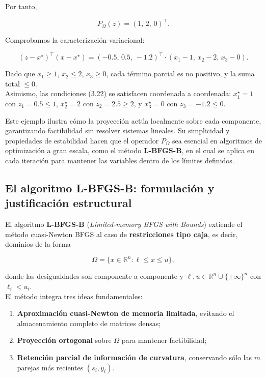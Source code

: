 \documentclass[
  spanish,
  us-letterpaper,
  DIV=11,
  numbers=noendperiod]{scrreprt}
\providecommand{\tightlist}{%
  \setlength{\itemsep}{0pt}\setlength{\parskip}{0pt}}
\numberwithin{equation}{section}
\begin{document}
Por tanto,

\[
P_\Omega(z) = (1,\, 2,\, 0)^\top.
\]

Comprobamos la caracterización variacional:

\[
(z - x^\star)^\top (x - x^\star)
= (-0.5,\, 0.5,\, -1.2)^\top \cdot (x_1-1,\, x_2-2,\, x_3-0).
\]

Dado que \(x_1 \ge 1\), \(x_2 \le 2\), \(x_3 \ge 0\), cada término
parcial es no positivo, y la suma total \(\le 0\).\\
Asimismo, las condiciones (3.22) se satisfacen coordenada a coordenada:
\(x_1^\star=1\) con \(z_1=0.5\le1\), \(x_2^\star=2\) con
\(z_2=2.5\ge2\), y \(x_3^\star=0\) con \(z_3=-1.2\le0\).

Este ejemplo ilustra cómo la proyección actúa localmente sobre cada
componente, garantizando factibilidad sin resolver sistemas lineales. Su
simplicidad y propiedades de estabilidad hacen que el operador
\(P_\Omega\) sea esencial en algoritmos de optimización a gran escala,
como el método \textbf{L-BFGS-B}, en el cual se aplica en cada iteración
para mantener las variables dentro de los límites definidos.

\subsection{El algoritmo L-BFGS-B: formulación y justificación
estructural}\label{el-algoritmo-l-bfgs-b-formulaciuxf3n-y-justificaciuxf3n-estructural}

El algoritmo \textbf{L-BFGS-B} (\emph{Limited-memory BFGS with Bounds})
extiende el método cuasi-Newton BFGS al caso de \textbf{restricciones
tipo caja}, es decir, dominios de la forma

\[
\Omega = \{x \in \mathbb{R}^n : \ell \le x \le u\},
\]

donde las desigualdades son componente a componente y
\(\ell, u \in \mathbb{R}^n \cup \{\pm\infty\}^n\) con
\(\ell_i < u_i\).\\
El método integra tres ideas fundamentales:

\begin{enumerate}
\def\labelenumi{\arabic{enumi}.}
\tightlist
\item
  \textbf{Aproximación cuasi-Newton de memoria limitada}, evitando el
  almacenamiento completo de matrices densas;
\item
  \textbf{Proyección ortogonal} sobre \(\Omega\) para mantener
  factibilidad;
\item
  \textbf{Retención parcial de información de curvatura}, conservando
  sólo las \(m\) parejas más recientes \((s_i, y_i)\).
\end{enumerate}
\end{document}
